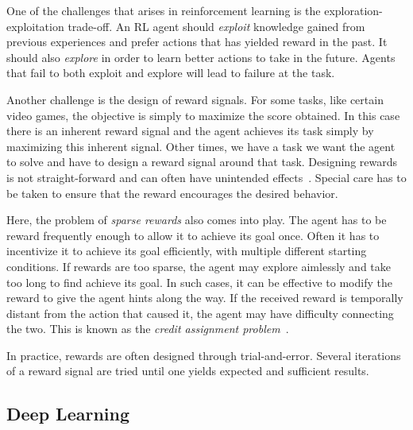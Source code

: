 
One of the challenges that arises in reinforcement learning is the exploration-exploitation trade-off.
An RL agent should \textit{exploit} knowledge gained from previous experiences and prefer actions that has yielded reward in the past.
It should also \textit{explore} in order to learn better actions to take in the future.
Agents that fail to both exploit and explore will lead to failure at the task.

Another challenge is the design of reward signals.
For some tasks, like certain video games, the objective is simply to maximize the score obtained.
In this case there is an inherent reward signal and the agent achieves its task simply by maximizing this inherent signal.
Other times, we have a task we want the agent to solve and have to design a reward signal around that task.
Designing rewards is not straight-forward and can often have unintended effects~\cite{sutton_reinforcement_2018}.
Special care has to be taken to ensure that the reward encourages the desired behavior.

Here, the problem of \textit{sparse rewards} also comes into play.
The agent has to be reward frequently enough to allow it to achieve its goal once.
Often it has to incentivize it to achieve its goal efficiently, with multiple different starting conditions.
If rewards are too sparse, the agent may explore aimlessly and take too long to find achieve its goal.
In such cases, it can be effective to modify the reward to give the agent hints along the way.
If the received reward is temporally distant from the action that caused it, the agent may have difficulty connecting the two.
This is known as the \textit{credit assignment problem}~\cite{minsky_cap_1961}.

In practice, rewards are often designed through trial-and-error.
Several iterations of a reward signal are tried until one yields expected and sufficient results.


\subsection{Deep Learning}

